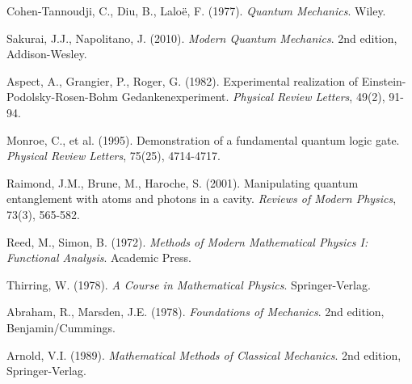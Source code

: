 \documentclass[12pt]{article}
\theoremstyle{plain}
\theoremstyle{definition}
\begin{document}
\begin{thebibliography}{99}
 Cohen-Tannoudji, C., Diu, B., Laloë, F. (1977). \emph{Quantum Mechanics}. Wiley.

 Sakurai, J.J., Napolitano, J. (2010). \emph{Modern Quantum Mechanics}. 2nd edition, Addison-Wesley.

 Aspect, A., Grangier, P., Roger, G. (1982). Experimental realization of Einstein-Podolsky-Rosen-Bohm Gedankenexperiment. \emph{Physical Review Letters}, 49(2), 91-94.

 Monroe, C., et al. (1995). Demonstration of a fundamental quantum logic gate. \emph{Physical Review Letters}, 75(25), 4714-4717.

 Raimond, J.M., Brune, M., Haroche, S. (2001). Manipulating quantum entanglement with atoms and photons in a cavity. \emph{Reviews of Modern Physics}, 73(3), 565-582.

 Reed, M., Simon, B. (1972). \emph{Methods of Modern Mathematical Physics I: Functional Analysis}. Academic Press.

 Thirring, W. (1978). \emph{A Course in Mathematical Physics}. Springer-Verlag.

 Abraham, R., Marsden, J.E. (1978). \emph{Foundations of Mechanics}. 2nd edition, Benjamin/Cummings.

 Arnold, V.I. (1989). \emph{Mathematical Methods of Classical Mechanics}. 2nd edition, Springer-Verlag.

\end{thebibliography}
\end{document}
